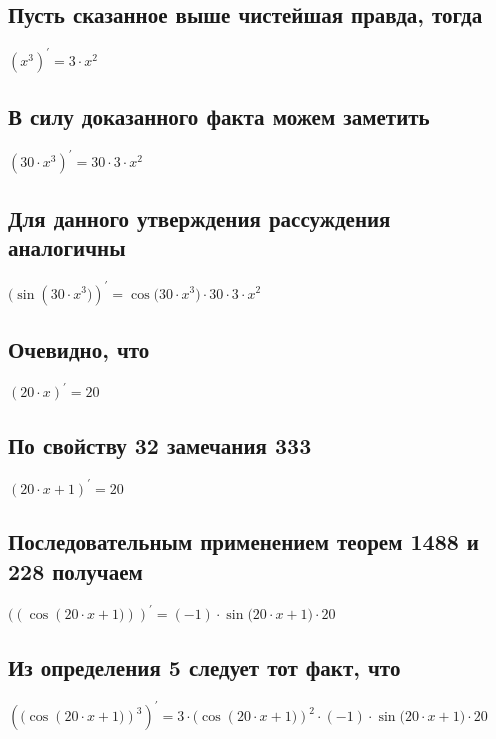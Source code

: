 \documentclass[12pt, letterpaper]{report}
\begin{document}
\subsection{Пусть сказанное выше чистейшая правда, тогда}
\begin{center} $({x}^{3})^{\prime} = {3}\cdot{{x}^{2}}$ \end{center} 

\subsection{В силу доказанного факта можем заметить}
\begin{center} $({30}\cdot{{x}^{3}})^{\prime} = {30}\cdot{{3}\cdot{{x}^{2}}}$ \end{center} 

\subsection{Для данного утверждения рассуждения аналогичны}
\begin{center} $(\sin({{30}\cdot{{x}^{3}})})^{\prime} = {\cos({{30}\cdot{{x}^{3}})}}\cdot{{30}\cdot{{3}\cdot{{x}^{2}}}}$ \end{center} 

\subsection{Очевидно, что}
\begin{center} $({20}\cdot{x})^{\prime} = 20$ \end{center} 

\subsection{По свойству 32 замечания 333}
\begin{center} $({{20}\cdot{x}}+{1})^{\prime} = 20$ \end{center} 

\subsection{Последовательным применением теорем 1488 и 228 получаем}
\begin{center} $((\cos({{{20}\cdot{x}}+{1})}))^{\prime} = {{(-1)}\cdot{\sin({{{20}\cdot{x}}+{1})}}}\cdot{20}$ \end{center} 

\subsection{Из определения 5 следует тот факт, что}
\begin{center} $({(\cos({{{20}\cdot{x}}+{1})})}^{3})^{\prime} = {{3}\cdot{{(\cos({{{20}\cdot{x}}+{1})})}^{2}}}\cdot{{{(-1)}\cdot{\sin({{{20}\cdot{x}}+{1})}}}\cdot{20}}$ \end{center} 
\end{document}
